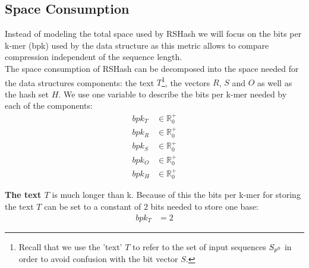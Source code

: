 \documentclass[a4paper,titlepage,onecolumn,oneside,12pt,nenglish,titlepage=firstiscover]{scrbook}
\theoremstyle{plain} %
\theoremstyle{definition} %
\theoremstyle{remark} %
\theoremstyle{plain}
\newcommand{\RR}{\mathbb{R}} %
\begin{document}
\subsection{Space Consumption}
Instead of modeling the total space used by RSHash we will focus on the bits per k-mer (bpk) used by the data structure as this metric allows to compare compression independent of the sequence length.\\
The space consumption of RSHash can be decomposed into the space needed for the data structures components: the text $T$\footnote{Recall that we use the 'text' $T$ to refer to the set of input sequences $S_{p^{0}}$ in order to avoid confusion with the bit vector $S$.}, the vectors $R$, $S$ and $O$ as well as the hash set $H$. We use one variable to describe the bits per k-mer needed by each of the components:
\begin{align}
	bpk_T &\in \RR_0^+ \label{variable:bpkT}\\
	bpk_R &\in \RR_0^+ \label{variable:bpkR}\\
	bpk_S &\in \RR_0^+ \label{variable:bpkS}\\
	bpk_O &\in \RR_0^+ \label{variable:bpkO}\\
	bpk_H &\in \RR_0^+ \label{variable:bpkH}
\end{align}

\textbf{The text $T$} is much longer than k. Because of this the bits per k-mer for storing the text $T$ can be set to a constant of $2$ bits needed to store one base:
\newcommand{\bpkT}{bpk_T &= 2}
\begin{align}
	\bpkT \label{constraint:bpkT}
\end{align} 
 
\end{document}
